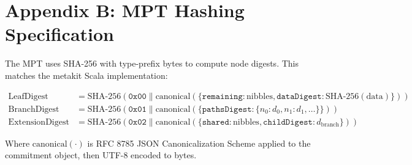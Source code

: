\documentclass[11pt,a4paper]{article}
\begin{document}
\section*{Appendix B: MPT Hashing Specification}

The MPT uses SHA-256 with type-prefix bytes to compute node digests. This matches the
metakit Scala implementation:

\begin{align*}
  \text{LeafDigest} &= \text{SHA-256}(\texttt{0x00} \| \text{canonical}(\{
    \texttt{remaining}: \text{nibbles}, \texttt{dataDigest}: \text{SHA-256}(\text{data})
  \})) \\[6pt]
  \text{BranchDigest} &= \text{SHA-256}(\texttt{0x01} \| \text{canonical}(\{
    \texttt{pathsDigest}: \{ n_0: d_0, n_1: d_1, \ldots \}
  \})) \\[6pt]
  \text{ExtensionDigest} &= \text{SHA-256}(\texttt{0x02} \| \text{canonical}(\{
    \texttt{shared}: \text{nibbles}, \texttt{childDigest}: d_{\text{branch}}
  \}))
\end{align*}

Where $\text{canonical}(\cdot)$ is RFC 8785 JSON Canonicalization Scheme applied to the
commitment object, then UTF-8 encoded to bytes.
\end{document}

